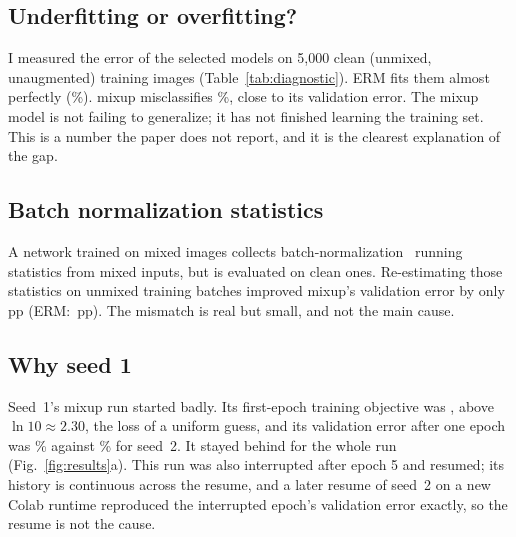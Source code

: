 \documentclass[conference]{IEEEtran}
\newcommand{\pp}{\,pp}
\begin{document}
\begin{table}[t]
\caption{Code-path check: validation error (\%) in the first five epochs}
\label{tab:check}
\centering
\small

\end{table}

\subsection{Underfitting or overfitting?}
I measured the error of the selected models on 5,000 clean (unmixed, unaugmented) training images
(Table~\ref{tab:diagnostic}). ERM fits them almost perfectly (\ErmCleanTrain\%). mixup misclassifies
\MixCleanTrain\%, close to its validation error. The mixup model is not failing to generalize; it
has not finished learning the training set. This is a number the paper does not report, and it is
the clearest explanation of the gap.

\subsection{Batch normalization statistics}
A network trained on mixed images collects batch-normalization~\cite{ioffe2015batchnorm} running
statistics from mixed inputs, but is evaluated on clean ones. Re-estimating those statistics on
unmixed training batches improved mixup's validation error by only \MixBNGain\pp{} (ERM:
\ErmBNGain\pp). The mismatch is real but small, and not the main cause.

\begin{table}[t]
\caption{Seed 1 diagnostic: validation and clean-training error (\%)}
\label{tab:diagnostic}
\centering
\small

\end{table}

\subsection{Why seed 1}
Seed~1's mixup run started badly. Its first-epoch training objective was \MixOneObjEpochOne, above
$\ln 10\approx2.30$, the loss of a uniform guess, and its validation error after one epoch was
\MixOneValEpochOne\% against \MixTwoValEpochOne\% for seed~2. It stayed behind for the whole run
(Fig.~\ref{fig:results}a). This run was also interrupted after epoch 5 and resumed; its history is
continuous across the resume, and a later resume of seed~2 on a new Colab runtime reproduced the
interrupted epoch's validation error exactly, so the resume is not the cause.
\end{document}

